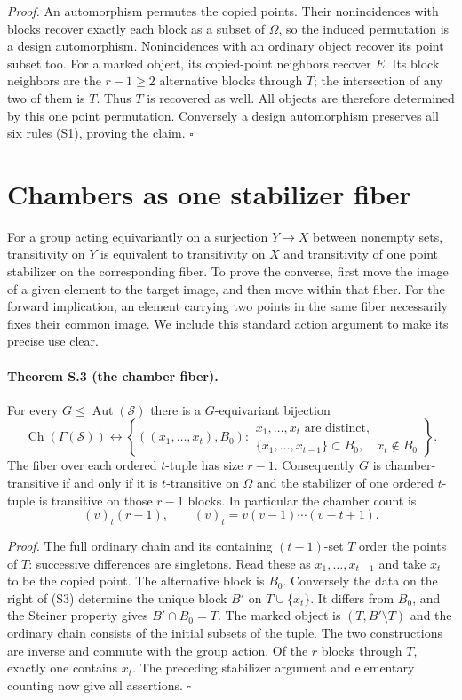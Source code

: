 \emph{Proof.}
An automorphism permutes the copied points. Their nonincidences with
blocks recover exactly each block as a subset of $\Omega$, so the
induced permutation is a design automorphism. Nonincidences with an
ordinary object recover its point subset too. For a marked object,
its copied-point neighbors recover $E$. Its block neighbors are the
$r-1\geq2$ alternative blocks through $T$; the intersection of any
two of them is $T$. Thus $T$ is recovered as well. All objects are
therefore determined by this one point permutation. Conversely a
design automorphism preserves all six rules (S1), proving the claim.
\hfill$\square$

\section{Chambers as one stabilizer fiber}

For a group acting equivariantly on a surjection $Y\to X$ between
nonempty sets, transitivity
on $Y$ is equivalent to transitivity on $X$ and transitivity of one
point stabilizer on the corresponding fiber. To prove the converse,
first move the image of a given element to the target image, and then
move within that fiber. For the forward implication, an element carrying
two points in the same fiber necessarily fixes their common image.
We include this standard action argument to make its precise use clear.

\paragraph{Theorem S.3 (the chamber fiber).}
For every $G\leq\operatorname{Aut}(\mathcal S)$ there is a
$G$-equivariant bijection
\[
\operatorname{Ch}(\Gamma(\mathcal S))\longleftrightarrow
\left\{((x_1,\ldots,x_t),B_0):
\begin{array}{l}
x_1,\ldots,x_t\text{ are distinct},\\
\{x_1,\ldots,x_{t-1}\}\subset B_0,\quad x_t\notin B_0
\end{array}\right\}.                                        \tag{S3}
\]
The fiber over each ordered $t$-tuple has size $r-1$. Consequently
$G$ is chamber-transitive if and only if it is $t$-transitive on
$\Omega$ and the stabilizer of one ordered $t$-tuple is transitive
on those $r-1$ blocks. In particular the chamber count is
\[
 (v)_t(r-1),\qquad (v)_t=v(v-1)\cdots(v-t+1).                 \tag{S4}
\]

\emph{Proof.}
The full ordinary chain and its containing $(t-1)$-set $T$ order the
points of $T$: successive differences are singletons. Read these as
$x_1,\ldots,x_{t-1}$ and take $x_t$ to be the copied point. The
alternative block is $B_0$. Conversely the data on the right of (S3)
determine the unique block $B'$ on
$T\cup\{x_t\}$. It differs from $B_0$, and the Steiner property
gives $B'\cap B_0=T$. The marked object is
$(T,B'\setminus T)$ and the ordinary chain consists of the initial
subsets of the tuple. The two constructions are inverse and commute
with the group action. Of the $r$ blocks through $T$, exactly one
contains $x_t$. The preceding stabilizer argument and elementary
counting now give all assertions. \hfill$\square$

